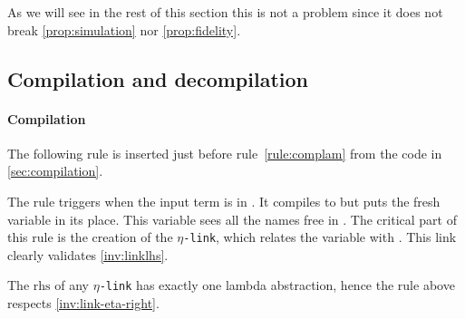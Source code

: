 \documentclass[sigconf,natbib=false,review]{acmart}
\newcommand{\appsep}{\ensuremath{\textcolor{lightgray}{\cdot}}}
\newcommand{\linkMacro}[1]{\ensuremath{#1}\texttt{-link}\xspace}
\newcommand{\linketa} {\linkMacro{\eta}}
\newcommand{\Ho}{\ensuremath{\mathcal{H}_o}\xspace}
\newcommand{\rhs}{\ensuremath{\mathrm{rhs}}\xspace}
\begin{document}
As we will see in the rest of this section this is not a problem
since it does not break
\cref{prop:simulation} nor \cref{prop:fidelity}.


% 


\subsection{Compilation and decompilation}\label{sec:etacomp}


\paragraph{Compilation}
The following rule is inserted just before rule~\ref{rule:complam} from the code in
\cref{sec:compilation}.



\noindent
The rule triggers when the input term  is in
\maybeeta. It compiles  to  but puts the fresh
variable  in its place. This variable sees all the names free in
. The critical part of this rule is the creation of the \linketa,
which relates the variable  with .
This link clearly validates \cref{inv:linklhs}.

\begin{corollary}
  The \rhs of any \linketa has exactly one lambda abstraction, hence
  the rule above respects \cref{inv:link-eta-right}.
  \label{cor:rhs-eta-onelamb}
\end{corollary}
\end{document}
